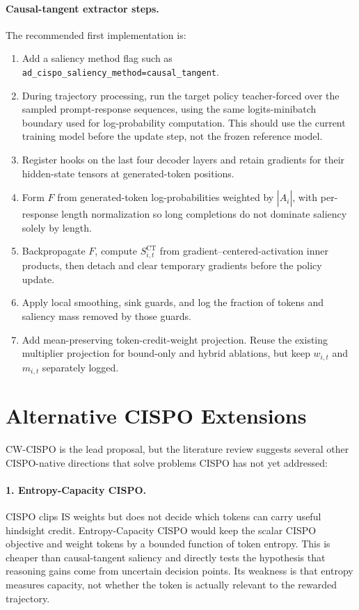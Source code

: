 \documentclass[11pt]{article}
\begin{document}
\paragraph{Causal-tangent extractor steps.}
The recommended first implementation is:
\begin{enumerate}[leftmargin=*]
  \item Add a saliency method flag such as
  \texttt{ad\_cispo\_saliency\_method=causal\_tangent}.
  \item During trajectory processing, run the target policy teacher-forced over
  the sampled prompt-response sequences, using the same logits-minibatch
  boundary used for log-probability computation.
  This should use the current training model before the update step, not the
  frozen reference model.
  \item Register hooks on the last four decoder layers and retain gradients for
  their hidden-state tensors at generated-token positions.
  \item Form $F$ from generated-token log-probabilities weighted by
  $|\hat{A}_i|$, with per-response length normalization so long completions do
  not dominate saliency solely by length.
  \item Backpropagate $F$, compute $S^{\mathrm{CT}}_{i,t}$ from
  gradient--centered-activation inner products, then detach and clear temporary
  gradients before the policy update.
  \item Apply local smoothing, sink guards, and log the fraction of tokens and saliency mass
  removed by those guards.
  \item Add mean-preserving token-credit-weight projection. Reuse the existing
  multiplier projection for bound-only and hybrid ablations, but keep
  $w_{i,t}$ and $m_{i,t}$ separately logged.
\end{enumerate}

\section{Alternative CISPO Extensions}

CW-CISPO is the lead proposal, but the literature review suggests several
other CISPO-native directions that solve problems CISPO has not yet addressed:

\paragraph{1. Entropy-Capacity CISPO.}
CISPO clips IS weights but does not decide which tokens can carry useful
hindsight credit. Entropy-Capacity CISPO would keep the scalar CISPO objective
and weight tokens by a bounded function of token entropy. This is cheaper than
causal-tangent saliency and directly tests the hypothesis that reasoning gains
come from uncertain decision points. Its weakness is that entropy measures
capacity, not whether the token is actually relevant to the rewarded
trajectory.
\end{document}
